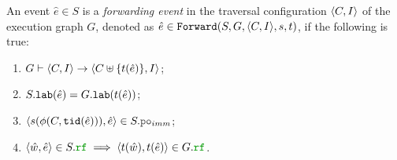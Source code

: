 \documentclass[12pt]{article}
\begin{document}
\begin{definition}
  An event $\hat{e} \in S$ is a \emph{forwarding event} in
  the traversal configuration $\langle C, I \rangle$ of the execution graph $G$,
  denoted as $\hat{e} \in {\mathtt{Forward}}(S, G, \langle C, I \rangle, s, t)$, if the following is true:
  \begin{enumerate}[label=\textbf{F.\arabic*}]
    \item \label{item:frwd-coverable}
      $G \vdash \langle C, I \rangle \rightarrow \langle C \uplus \{t(\hat{e})\}, I \rangle$;
    \item \label{item:frwd-desc}
      $S.{\mathtt{lab}}(\hat{e}) = G.{\mathtt{lab}}(t(\hat{e}))$;
    \item \label{item:frwd-front}
      $\tup{s(\front(C, \lTID(\hat{e}))), \hat{e}} \in S.\lPO_{imm}$;
    \item \label{item:frwd-rf}
      $\tup{\hat{w}, \hat{e}} \in S.\lRF \implies \tup{t(\hat{w}), t(\hat{e})} \in G.\lRF$.
  \end{enumerate}
\end{definition}
\end{document}
